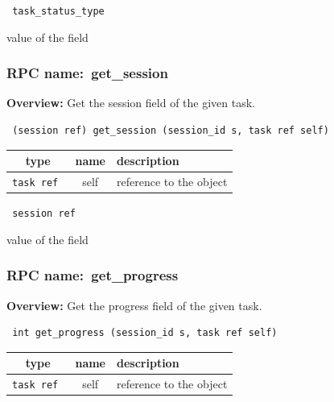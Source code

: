 \vspace{0.3cm}

{\tt 
task\_status\_type
}


value of the field
\vspace{0.3cm}
\vspace{0.3cm}
\vspace{0.3cm}
\subsubsection{RPC name:~get\_session}

{\bf Overview:} 
Get the session field of the given task.

\begin{verbatim} (session ref) get_session (session_id s, task ref self)\end{verbatim}



 
\vspace{0.3cm}
\begin{tabular}{|c|c|p{7cm}|}
 \hline
{\bf type} & {\bf name} & {\bf description} \\ \hline
{\tt task ref } & self & reference to the object \\ \hline 

\end{tabular}

\vspace{0.3cm}

{\tt 
session ref
}


value of the field
\vspace{0.3cm}
\vspace{0.3cm}
\vspace{0.3cm}
\subsubsection{RPC name:~get\_progress}

{\bf Overview:} 
Get the progress field of the given task.

\begin{verbatim} int get_progress (session_id s, task ref self)\end{verbatim}



 
\vspace{0.3cm}
\begin{tabular}{|c|c|p{7cm}|}
 \hline
{\bf type} & {\bf name} & {\bf description} \\ \hline
{\tt task ref } & self & reference to the object \\ \hline 

\end{tabular}

